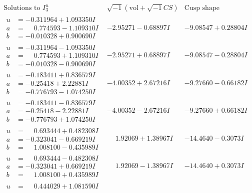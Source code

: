 \documentclass[1p]{elsarticle_modified}
\theoremstyle{definition}
\newcommand{\I}{\sqrt{-1}}
\begin{document}
$$\begin{array}{c|c|c}  
\text{Solutions to }I^u_{3}& \I (\text{vol} + \sqrt{-1}CS) & \text{Cusp shape}\\
 \hline 
\begin{aligned}
u &= -0.311964 + 1.093350 I \\
a &= \phantom{-}0.774593 - 1.109310 I \\
b &= -0.010328 + 0.900690 I\end{aligned}
 & -2.95271 - 0.68897 I & -9.08547 + 0.28804 I \\ \hline\begin{aligned}
u &= -0.311964 - 1.093350 I \\
a &= \phantom{-}0.774593 + 1.109310 I \\
b &= -0.010328 - 0.900690 I\end{aligned}
 & -2.95271 + 0.68897 I & -9.08547 - 0.28804 I \\ \hline\begin{aligned}
u &= -0.183411 + 0.836579 I \\
a &= -0.25418 + 2.22881 I \\
b &= -0.776793 - 1.074250 I\end{aligned}
 & -4.00352 + 2.67216 I & -9.27660 - 0.66182 I \\ \hline\begin{aligned}
u &= -0.183411 - 0.836579 I \\
a &= -0.25418 - 2.22881 I \\
b &= -0.776793 + 1.074250 I\end{aligned}
 & -4.00352 - 2.67216 I & -9.27660 + 0.66182 I \\ \hline\begin{aligned}
u &= \phantom{-}0.693444 + 0.482308 I \\
a &= -0.323041 - 0.669219 I \\
b &= \phantom{-}1.008100 - 0.435989 I\end{aligned}
 & \phantom{-}1.92069 + 1.38967 I & -14.4640 - 0.3073 I \\ \hline\begin{aligned}
u &= \phantom{-}0.693444 - 0.482308 I \\
a &= -0.323041 + 0.669219 I \\
b &= \phantom{-}1.008100 + 0.435989 I\end{aligned}
 & \phantom{-}1.92069 - 1.38967 I & -14.4640 + 0.3073 I \\ \hline\begin{aligned}
u &= \phantom{-}0.444029 + 1.081590 I \\

\end{aligned}
\end{array}$$
\end{document}
